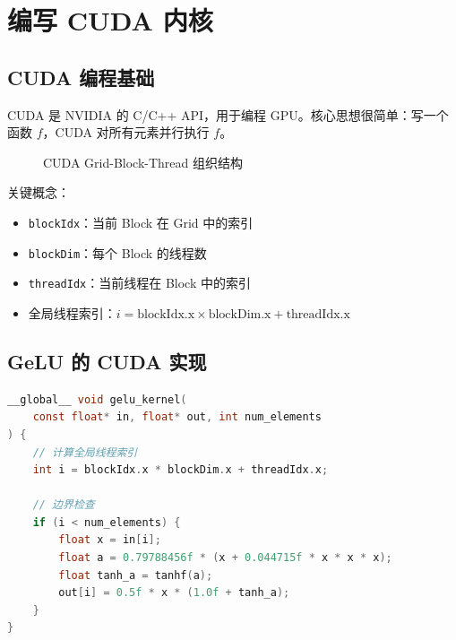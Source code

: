 \section{编写 CUDA 内核}

\subsection{CUDA 编程基础}

CUDA 是 NVIDIA 的 C/C++ API，用于编程 GPU。核心思想很简单：写一个函数 $f$，CUDA 对所有元素并行执行 $f$。

\begin{figure}[H]
\centering
{}
\caption{CUDA Grid-Block-Thread 组织结构}
\end{figure}

关键概念：
\begin{itemize}
    \item \texttt{blockIdx}：当前 Block 在 Grid 中的索引
    \item \texttt{blockDim}：每个 Block 的线程数
    \item \texttt{threadIdx}：当前线程在 Block 中的索引
    \item 全局线程索引：$i = \text{blockIdx.x} \times \text{blockDim.x} + \text{threadIdx.x}$
\end{itemize}

\subsection{GeLU 的 CUDA 实现}

\begin{lstlisting}[caption={GeLU CUDA 内核（gelu.cu）},language=C]
__global__ void gelu_kernel(
    const float* in, float* out, int num_elements
) {
    // 计算全局线程索引
    int i = blockIdx.x * blockDim.x + threadIdx.x;

    // 边界检查
    if (i < num_elements) {
        float x = in[i];
        float a = 0.79788456f * (x + 0.044715f * x * x * x);
        float tanh_a = tanhf(a);
        out[i] = 0.5f * x * (1.0f + tanh_a);
    }
}
\end{lstlisting}

